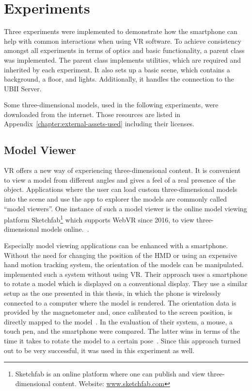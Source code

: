 \section{Experiments}\label{section:experiments}

Three experiments were implemented to demonstrate how the smartphone can help with common interactions when using \gls{VR} software.
To achieve consistency amongst all experiments in terms of optics and basic functionality, a parent class was implemented. The parent class implements utilities, which are required and inherited by each experiment. It also sets up a basic scene, which contains a background, a floor, and lights. Additionally, it handles the connection to the \gls{UBII} Server.

Some three-dimensional models, used in the following experiments, were downloaded from the internet. Those resources are listed in Appendix~\ref{chapter:external-assets-used} including their licenses.


\subsection{Model Viewer}\label{subsection:model-viewer}

\acrlong{VR} offers a new way of experiencing three-dimensional content. It is convenient to view a model from different angles and gives a feel of a real presence of the object. Applications where the user can load custom three-dimensional models into the scene and use the app to explorer the models are commonly called \enquote{model viewers}. One instance of such a model viewer is the online model viewing platform Sketchfab\footnote{Sketchfab is an online platform where one can publish and view three-dimensional content. Website: \href{https://sketchfab.com}{www.sketchfab.com}} which supports Web\gls{VR} since 2016, to view three-dimensional models online.~\cite{Denoyel.2016}. 

Especially model viewing applications can be enhanced with a smartphone. Without the need for changing the position of the \gls{HMD} or using an expensive hand motion tracking system, the orientation of the models can be manipulated.
\citeauthor{Katzakis.2010} implemented such a system without using \gls{VR}. Their approach uses a smartphone to rotate a model which is displayed on a conventional display. They use a similar setup as the one presented in this thesis, in which the phone is wirelessly connected to a computer where the model is rendered. The orientation data is provided by the magnetometer and, once calibrated to the screen position, is directly mapped to the model~\cite[139]{Katzakis.2010}. In the evaluation of their system, a mouse, a touch pen, and the smartphone were compared. The latter wins in terms of the time it takes to rotate the model to a certain pose~\cite[140]{Katzakis.2010}.
Since this approach turned out to be very successful, it was used in this experiment as well.

